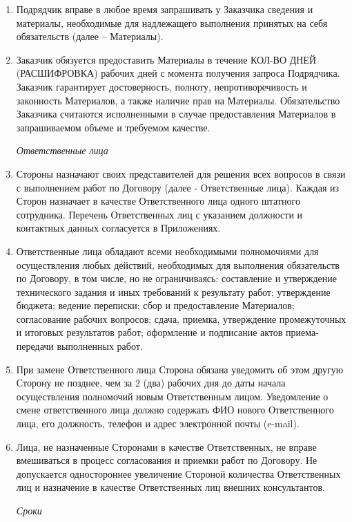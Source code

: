 \documentclass[14pt,a4paper]{article}
\begin{document}
\begin{enumerate}
\begin{enumerate}
		\item Подрядчик вправе в любое время запрашивать у Заказчика сведения и материалы, необходимые для надлежащего выполнения принятых на себя обязательств (далее – Материалы).

		\item Заказчик обязуется предоставить Материалы в течение КОЛ-ВО ДНЕЙ (РАСШИФРОВКА) рабочих дней с момента получения запроса Подрядчика. Заказчик гарантирует достоверность, полноту, непротиворечивость и законность Материалов, а также наличие прав на Материалы. Обязательство Заказчика считаются исполненными в случае предоставления Материалов в запрашиваемом объеме и требуемом качестве.

		\textit{Ответственные лица}

		\item Стороны назначают своих представителей для решения всех вопросов в связи с выполнением работ по Договору (далее - Ответственные лица). Каждая из Сторон назначает в качестве Ответственного лица одного штатного сотрудника. Перечень Ответственных лиц с указанием должности и контактных данных согласуется в Приложениях.

		\item Ответственные лица обладают всеми необходимыми полномочиями для осуществления любых действий, необходимых для выполнения обязательств по Договору, в том числе, но не ограничиваясь: составление и утверждение технического задания и иных требований к результату работ; утверждение бюджета; ведение переписки; сбор и предоставление Материалов; согласование рабочих вопросов; сдача, приемка, утверждение промежуточных и итоговых результатов работ; оформление и подписание актов приема-передачи выполненных работ.

		\item При замене Ответственного лица Сторона обязана уведомить об этом другую Сторону не позднее, чем за 2 (два) рабочих дня до даты начала осуществления полномочий новым Ответственным лицом. Уведомление о смене ответственного лица должно содержать ФИО нового Ответственного лица, его должность, телефон и адрес электронной почты (e-mail).

		\item Лица, не назначенные Сторонами в качестве Ответственных, не вправе вмешиваться в процесс согласования и приемки работ по Договору. Не допускается одностороннее увеличение Стороной количества Ответственных лиц и назначение в качестве Ответственных лиц внешних консультантов.

		\textit{Сроки}


\end{enumerate}
\end{enumerate}
\end{document}
